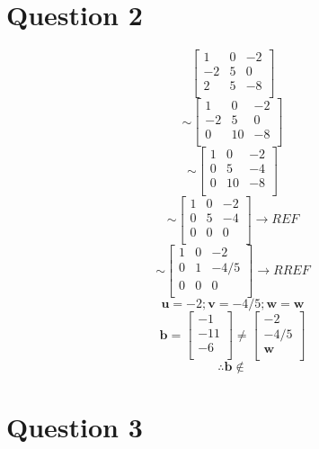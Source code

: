 \documentclass{report}
\begin{document}
\section*{Question 2}
\begin{equation}
\begin{bmatrix}
1 & 0 & -2 \\ 
-2 & 5 & 0 \\ 
2 & 5 & -8 \\ 
\end{bmatrix}
\end{equation}
\begin{equation}
\sim
\begin{bmatrix}
1 & 0 & -2 \\ 
-2 & 5 & 0 \\ 
0 & 10 & -8 \\ 
\end{bmatrix}
\end{equation}
\begin{equation}
\sim
\begin{bmatrix}
1 & 0 & -2 \\ 
0 & 5 & -4 \\ 
0 & 10 & -8 \\ 
\end{bmatrix}
\end{equation}
\begin{equation}
\sim
\begin{bmatrix}
1 & 0 & -2 \\ 
0 & 5 & -4 \\ 
0 & 0 & 0 \\ 
\end{bmatrix}
\rightarrow
REF
\end{equation}
\begin{equation}
\sim
\begin{bmatrix}
1 & 0 & -2 \\ 
0 & 1 & -4/5 \\ 
0 & 0 & 0 \\ 
\end{bmatrix}
\rightarrow
RREF
\end{equation}
\begin{equation*}
\textbf{u}
=-2;
\textbf{v}
=-4/5;
\textbf{w}
=
\textbf{w}
\end{equation*}
\begin{equation}
\textbf{b}
=
\begin{bmatrix}
-1 \\ 
-11 \\ 
-6 \\ 
\end{bmatrix}
\neq
\begin{bmatrix}
-2 \\ 
-4/5 \\ 
\textbf{w} \\ 
\end{bmatrix}
\end{equation}
\begin{equation}
\therefore
\textbf{b}
\notin
\end{equation}

\clearpage
\section*{Question 3}
\end{document}
